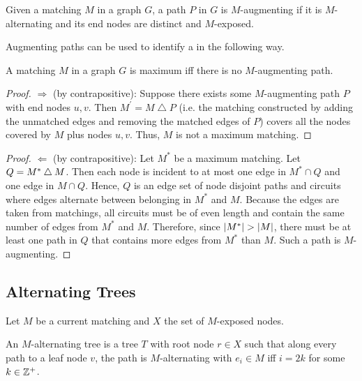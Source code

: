 \begin{definition}
    Given a matching $M$ in a graph $G$, a path $P$ in $G$ is $M$-augmenting if it is $M$-alternating and  
    its end nodes are distinct and $M$-exposed. 
    \label{def:augment_path}
\end{definition}

Augmenting paths can be used to identify a \maxmatch{} in the following way. 

\begin{theorem}
    A matching $M$ in a graph $G$ is maximum iff there is no $M$-augmenting path. 
    \label{thm:augmenting_path}
\end{theorem}
\begin{proof}
    $\Longrightarrow$ (by contrapositive): Suppose there exists some $M$-augmenting path $P$ with end nodes $u, v$. 
    Then $M^\prime = M \bigtriangleup P$ (i.e.\! the matching constructed by adding the unmatched edges and removing the matched edges of $P$)
    covers all the nodes covered by $M$ plus nodes $u, v$. Thus, $M$ is not a maximum matching. 
\end{proof}
\begin{proof}
    $\Longleftarrow$ (by contrapositive): Let $M^{\ast}$ be a maximum matching. Let $Q = M^{\ast} \bigtriangleup M$. 
    Then each node is incident to at most one edge in $M^{\ast} \cap Q$ and one edge in $M \cap Q$. Hence, $Q$ is an edge set 
    of node disjoint paths and circuits where edges alternate between belonging in $M^{\ast}$ and $M$. 
    Because the edges are taken from matchings, all circuits must be of even length 
    and contain the same number of edges from $M^{\ast}$ and $M$. Therefore, since $\left\lvert M^{\ast} \right\rvert > \left\lvert M \right\rvert$, 
    there must be at least one path in $Q$ that contains more edges from $M^{\ast}$ than $M$. Such a path is 
    $M$-augmenting. 
\end{proof}

\subsection{Alternating Trees}

Let $M$ be a current matching and $X$ the set of $M$-exposed nodes. 

\begin{definition}
    An $M$-alternating tree is a tree $T$ with root node $r \in X$ such that along every path to a leaf node $v$, 
    the path is $M$-alternating with $e_i \in M$ iff $i = 2k$ for some $k \in \mathbb{Z}^+$. 
    \label{def:alternating_tree}
\end{definition}